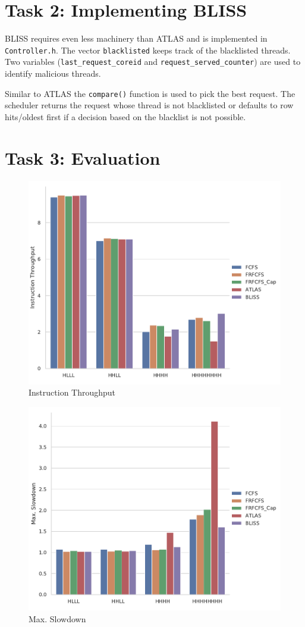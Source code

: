 \documentclass[a4paper]{article}
\begin{document}
\section*{Task 2: Implementing BLISS}

BLISS requires even less machinery than ATLAS and is implemented in
\verb|Controller.h|. The vector \verb|blacklisted| keeps track of the
blacklisted threads. Two variables (\verb|last_request_coreid| and
\verb|request_served_counter|) are used to identify malicious threads.

Similar to ATLAS the \verb|compare()| function is used to pick the best request.
The scheduler returns the request whose thread is not blacklisted or defaults to
row hits/oldest first if a decision based on the blacklist is not possible.

\section*{Task 3: Evaluation}


\begin{figure}
    \centering
    \includegraphics[width=\textwidth]{inst_throughput}
    \caption{Instruction Throughput}
    \label{fig:inst-througput}
\end{figure}

\begin{figure}
    \centering
    \includegraphics[width=\textwidth]{max_slowdown}
    \caption{Max. Slowdown}
    \label{fig:max-slowdown}
\end{figure}
\end{document}
